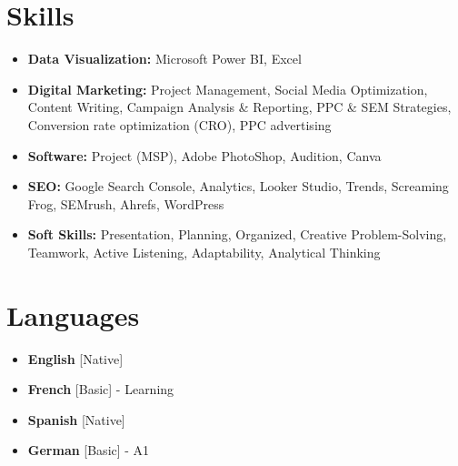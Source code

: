 \documentclass[11pt,a4paper,sans]{moderncv}
\begin{document}
\section{Skills}
{\begin{itemize}[label=\textbullet]
\item {\textbf{Data Visualization:} Microsoft Power BI, Excel}
\item {\textbf{Digital Marketing:} Project Management, Social Media Optimization, Content Writing, Campaign Analysis \& Reporting, PPC \& SEM Strategies, Conversion rate optimization (CRO), PPC advertising}
\item {\textbf{Software:} Project (MSP), Adobe PhotoShop, Audition, Canva}
\item {\textbf{SEO:} Google Search Console, Analytics, Looker Studio, Trends, Screaming Frog, SEMrush, Ahrefs, WordPress}
\item {\textbf{Soft Skills:} Presentation, Planning, Organized, Creative Problem-Solving, Teamwork, Active Listening, Adaptability, Analytical Thinking}
\end{itemize}}

\section{Languages}
\begin{multicols}{2}
    \begin{itemize}[label=\textbullet]
    \item \textbf{English} [Native]
    \item {\textbf{French} [Basic] - Learning}
    \item {\textbf{Spanish} [Native]}
    \item {\textbf{German} [Basic] - A1}
    \end{itemize}
\end{multicols}
\end{document}
